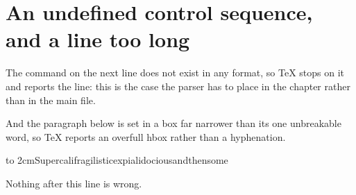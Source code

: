 \section{An undefined control sequence, and a line too long}

The command on the next line does not exist in any format, so \TeX{} stops
on it and reports the line: this is the case the parser has to place in the
chapter rather than in the main file.

\thiscommanddoesnotexist

And the paragraph below is set in a box far narrower than its one unbreakable
word, so \TeX{} reports an overfull hbox rather than a hyphenation.

\noindent\hbox to 2cm{Supercalifragilisticexpialidociousandthensome}

\noindent Nothing after this line is wrong.
